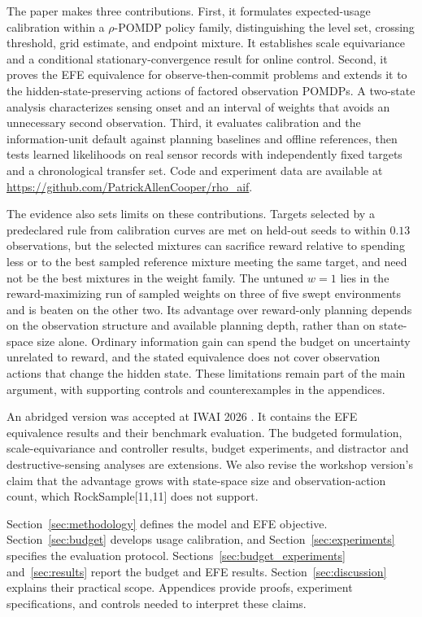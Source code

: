 \documentclass[manuscript, screen, review]{jair}
\begin{document}
The paper makes three contributions. First, it formulates expected-usage calibration within a $\rho$-POMDP policy family, distinguishing the level set, crossing threshold, grid estimate, and endpoint mixture. It establishes scale equivariance and a conditional stationary-convergence result for online control. Second, it proves the EFE equivalence for observe-then-commit problems and extends it to the hidden-state-preserving actions of factored observation POMDPs. A two-state analysis characterizes sensing onset and an interval of weights that avoids an unnecessary second observation. Third, it evaluates calibration and the information-unit default against planning baselines and offline references, then tests learned likelihoods on real sensor records with independently fixed targets and a chronological transfer set. Code and experiment data are available at \url{https://github.com/PatrickAllenCooper/rho_aif}.

The evidence also sets limits on these contributions. Targets selected by a predeclared rule from calibration curves are met on held-out seeds to within $0.13$ observations, but the selected mixtures can sacrifice reward relative to spending less or to the best sampled reference mixture meeting the same target, and need not be the best mixtures in the weight family. The untuned $w=1$ lies in the reward-maximizing run of sampled weights on three of five swept environments and is beaten on the other two. Its advantage over reward-only planning depends on the observation structure and available planning depth, rather than on state-space size alone. Ordinary information gain can spend the budget on uncertainty unrelated to reward, and the stated equivalence does not cover observation actions that change the hidden state. These limitations remain part of the main argument, with supporting controls and counterexamples in the appendices.

An abridged version was accepted at IWAI 2026 \citep{cooper2026iwai}. It contains the EFE equivalence results and their benchmark evaluation. The budgeted formulation, scale-equivariance and controller results, budget experiments, and distractor and destructive-sensing analyses are extensions. We also revise the workshop version's claim that the advantage grows with state-space size and observation-action count, which RockSample[11,11] does not support.

Section~\ref{sec:methodology} defines the model and EFE objective. Section~\ref{sec:budget} develops usage calibration, and Section~\ref{sec:experiments} specifies the evaluation protocol. Sections~\ref{sec:budget_experiments} and~\ref{sec:results} report the budget and EFE results. Section~\ref{sec:discussion} explains their practical scope. Appendices provide proofs, experiment specifications, and controls needed to interpret these claims.
\end{document}

